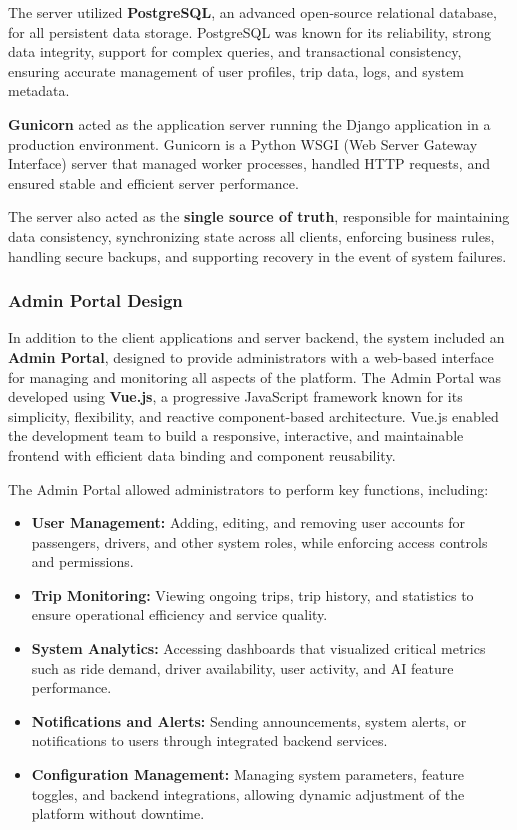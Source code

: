 The server utilized \textbf{PostgreSQL}, an advanced open-source relational
database, for all persistent data storage. PostgreSQL was known for its
reliability, strong data integrity, support for complex queries, and
transactional consistency, ensuring accurate management of user profiles, trip
data, logs, and system metadata.


\textbf{Gunicorn} acted as the application server running the Django application in a production environment. Gunicorn is a Python WSGI (Web Server Gateway Interface) server that managed worker processes, handled HTTP requests, and ensured stable and efficient server performance.

The server also acted as the \textbf{single source of truth}, responsible for
maintaining data consistency, synchronizing state across all clients, enforcing
business rules, handling secure backups, and supporting recovery in the event of
system failures.


\subsubsection{Admin Portal Design}

In addition to the client applications and server backend, the system included
an \textbf{Admin Portal}, designed to provide administrators with a web-based
interface for managing and monitoring all aspects of the platform. The Admin
Portal was developed using \textbf{Vue.js}, a progressive JavaScript framework
known for its simplicity, flexibility, and reactive component-based
architecture. Vue.js enabled the development team to build a responsive,
interactive, and maintainable frontend with efficient data binding and component
reusability.


The Admin Portal allowed administrators to perform key functions, including:


\begin{itemize}
 \item \textbf{User Management:} Adding, editing, and removing user
        accounts for passengers, drivers, and other system roles, while
        enforcing access controls and permissions.

 \item \textbf{Trip Monitoring:} Viewing ongoing trips, trip history, and
        statistics to ensure operational efficiency and service quality.

 \item \textbf{System Analytics:} Accessing dashboards that visualized
        critical metrics such as ride demand, driver availability, user
        activity, and AI feature performance.

 \item \textbf{Notifications and Alerts:} Sending announcements, system
        alerts, or notifications to users through integrated backend services.

 \item \textbf{Configuration Management:} Managing system parameters,
        feature toggles, and backend integrations, allowing dynamic adjustment
        of the platform without downtime.
\end{itemize}

